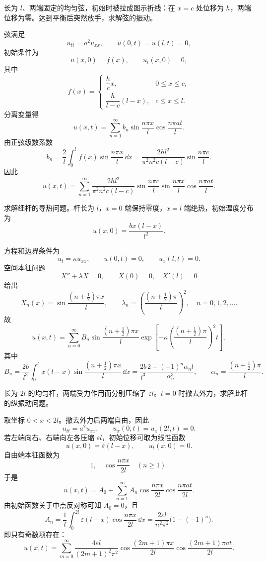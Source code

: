 

\begin{question}
长为 \(l\)、两端固定的均匀弦，初始时被拉成图示折线：在 \(x=c\) 处位移为 \(h\)，两端位移为零。达到平衡后突然放手，求解弦的振动。
\begin{solution}
弦满足
\[
u_{tt}=a^2u_{xx},\qquad u(0,t)=u(l,t)=0,
\]
初始条件为
\[
u(x,0)=f(x),\qquad u_t(x,0)=0,
\]
其中
\[
f(x)=
\begin{cases}
\dfrac{h}{c}x,&0\le x\le c,\\
\dfrac{h}{l-c}(l-x),&c\le x\le l.
\end{cases}
\]
分离变量得
\[
u(x,t)=\sum_{n=1}^{\infty}b_n\sin\frac{n\pi x}{l}\cos\frac{n\pi at}{l}.
\]
由正弦级数系数
\[
b_n=\frac{2}{l}\int_0^l f(x)\sin\frac{n\pi x}{l}\,\dd{x}
=\frac{2hl^2}{\pi^2n^2c(l-c)}\sin\frac{n\pi c}{l}.
\]
因此
\[
u(x,t)=\sum_{n=1}^{\infty}
\frac{2hl^2}{\pi^2n^2c(l-c)}\sin\frac{n\pi c}{l}
\sin\frac{n\pi x}{l}\cos\frac{n\pi at}{l}.
\]
\end{solution}
\end{question}

\begin{question}
求解细杆的导热问题。杆长为 \(l\)，\(x=0\) 端保持零度，\(x=l\) 端绝热，初始温度分布为
\[
u(x,0)=\frac{b x(l-x)}{l^2}.
\]
\begin{solution}
方程和边界条件为
\[
u_t=\kappa u_{xx},\qquad u(0,t)=0,\qquad u_x(l,t)=0.
\]
空间本征问题
\[X''+\lambda X=0,\qquad X(0)=0,\quad X'(l)=0
\]
给出
\[
X_n(x)=\sin\frac{(n+\frac12)\pi x}{l},\qquad
\lambda_n=\left(\frac{(n+\frac12)\pi}{l}\right)^2,
\quad n=0,1,2,\ldots .
\]
故
\[
u(x,t)=\sum_{n=0}^{\infty}B_n
\sin\frac{(n+\frac12)\pi x}{l}
\exp\left[-\kappa\left(\frac{(n+\frac12)\pi}{l}\right)^2t\right],
\]
其中
\[
B_n=\frac{2b}{l^3}\int_0^l x(l-x)
\sin\frac{(n+\frac12)\pi x}{l}\,\dd{x}
=\frac{2b}{l^3}\frac{2-(-1)^n\alpha_nl}{\alpha_n^3},
\qquad
\alpha_n=\frac{(n+\frac12)\pi}{l}.
\]
\end{solution}
\end{question}

\begin{question}
长为 \(2l\) 的均匀杆，两端受力作用而分别压缩了 \(\varepsilon l\)。\(t=0\) 时撤去外力，求解此杆的纵振动问题。
\begin{solution}
取坐标 \(0<x<2l\)。撤去外力后两端自由，因此
\[
u_{tt}=a^2u_{xx},\qquad u_x(0,t)=u_x(2l,t)=0.
\]
若左端向右、右端向左各压缩 \(\varepsilon l\)，初始位移可取为线性函数
\[
u(x,0)=\varepsilon(l-x),\qquad u_t(x,0)=0.
\]
自由端本征函数为
\[
1,\quad \cos\frac{n\pi x}{2l}\quad(n\ge1).
\]
于是
\[
u(x,t)=A_0+\sum_{n=1}^{\infty}A_n
\cos\frac{n\pi x}{2l}\cos\frac{n\pi at}{2l}.
\]
由初始函数关于中点反对称可知 \(A_0=0\)，且
\[
A_n=\frac1l\int_0^{2l}\varepsilon(l-x)\cos\frac{n\pi x}{2l}\,\dd{x}
=\frac{2\varepsilon l}{n^2\pi^2}\bigl(1-(-1)^n\bigr).
\]
即只有奇数项存在：
\[
u(x,t)=\sum_{m=0}^{\infty}
\frac{4\varepsilon l}{(2m+1)^2\pi^2}
\cos\frac{(2m+1)\pi x}{2l}
\cos\frac{(2m+1)\pi at}{2l}.
\]
\end{solution}
\end{question}

